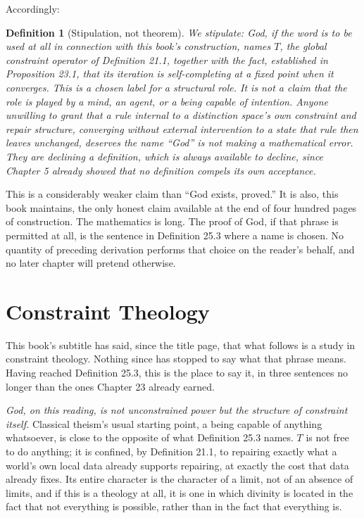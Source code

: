 \documentclass[11pt]{book}
\newtheorem{definition}[theorem]{Definition}
\begin{document}
Accordingly:

\begin{definition}[Stipulation, not theorem]
We stipulate: \emph{God}, if the word is to be used at all in connection with this book's construction, names $T$, the global constraint operator of Definition 21.1, together with the fact, established in Proposition 23.1, that its iteration is self-completing at a fixed point when it converges. This is a chosen label for a structural role. It is not a claim that the role is played by a mind, an agent, or a being capable of intention. Anyone unwilling to grant that a rule internal to a distinction space's own constraint and repair structure, converging without external intervention to a state that rule then leaves unchanged, deserves the name ``God'' is not making a mathematical error. They are declining a definition, which is always available to decline, since Chapter 5 already showed that no definition compels its own acceptance.
\end{definition}

This is a considerably weaker claim than ``God exists, proved.'' It is also, this book maintains, the only honest claim available at the end of four hundred pages of construction. The mathematics is long. The proof of God, if that phrase is permitted at all, is the sentence in Definition 25.3 where a name is chosen. No quantity of preceding derivation performs that choice on the reader's behalf, and no later chapter will pretend otherwise.

\chapter*{Constraint Theology}

This book's subtitle has said, since the title page, that what follows is a study in constraint theology. Nothing since has stopped to say what that phrase means. Having reached Definition 25.3, this is the place to say it, in three sentences no longer than the ones Chapter 23 already earned.

\emph{God, on this reading, is not unconstrained power but the structure of constraint itself.} Classical theism's usual starting point, a being capable of anything whatsoever, is close to the opposite of what Definition 25.3 names. $T$ is not free to do anything; it is confined, by Definition 21.1, to repairing exactly what a world's own local data already supports repairing, at exactly the cost that data already fixes. Its entire character is the character of a limit, not of an absence of limits, and if this is a theology at all, it is one in which divinity is located in the fact that not everything is possible, rather than in the fact that everything is.
\end{document}
